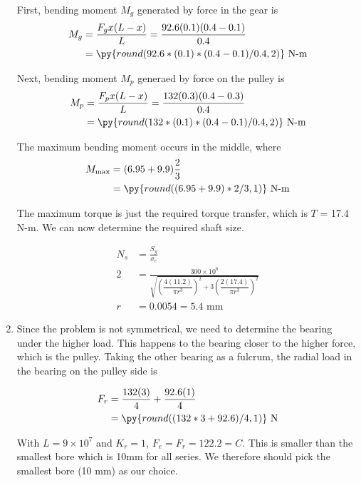 \documentclass[
10pt,
a4paper,
openany,
svgnames,
]{book}
\begin{document}
\begin{solution}
\begin{enumerate}
          First, bending moment $M_{g}$ generated by force in the gear is
          \begin{align*}
            M_{g} &= \frac{F_{g}x(L-x)}{L} = \frac{92.6(0.1)(0.4-0.1)}{0.4} \\
                  &= \py{round(92.6*(0.1)*(0.4-0.1)/0.4,2)} \text{ N-m}
          \end{align*}

          Next, bending moment $M_{p}$ generaed by force on the pulley is
          \begin{align*}
            M_{p} &= \frac{F_{p}x(L-x)}{L} = \frac{132(0.3)(0.4-0.3)}{0.4} \\
                  &= \py{round(132*(0.1)*(0.4-0.1)/0.4,2)} \text{ N-m}
          \end{align*}

          The maximum bending moment occurs in the middle, where
          \begin{align*}
            M_{\max} &= (6.95 + 9.9)\frac{2}{3} \\
                     &= \py{round((6.95+9.9)*2/3,1)} \text{ N-m}
          \end{align*}

          The maximum torque is just the required torque transfer, which is $T$ = 17.4 N-m. We can now determine the required shaft size.

          \begin{align*}
            N_{s} &= \frac{S_{y}}{\sigma_{e}} \\
            2 &= \frac{300 \times 10^{6}}{\sqrt{ \left( \dfrac{4(11.2)}{\pi r^{3}} \right)^{2} + 3 \left( \dfrac{2(17.4)}{\pi r^{3}} \right)^{2} }} \\
            r &= 0.0054 = 5.4 \text{ mm}
          \end{align*}

    \item Since the problem is not symmetrical, we need to determine the bearing under the higher load. This happens to the bearing closer to the higher force, which is the pulley. Taking the other bearing as a fulcrum, the radial load in the bearing on the pulley side is

          \begin{align*}
            F_{r} &= \frac{132(3)}{4} + \frac{92.6(1)}{4} \\
                  &= \py{round((132*3+92.6)/4,1)} \text{ N}
          \end{align*}

          With $L = 9 \times 10^{7}$ and $K_{r} = 1$, $F_{e} = F_{r} = 122.2 = C$. This is smaller than the smallest bore which is 10mm for all series. We therefore should pick the smallest bore (10 mm) as our choice.
  \end{enumerate}
\end{solution}


\backmatter{}

\printbibliography[heading=bibintoc]
\end{document}
